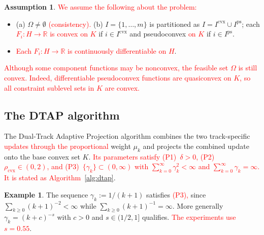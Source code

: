 \documentclass[]{interact}
\theoremstyle{plain}
\theoremstyle{definition}
\newtheorem{example}[theorem]{Example}
\newtheorem{assumption}{Assumption}
\theoremstyle{remark}
\newcommand{\R}{\mathbb{R}}
\newcommand{\cvx}{\mathrm{cvx}}
\newcommand{\ps}{\mathrm{ps}}
\begin{document}
\begin{assumption}\label{ass:standing}
\leavevmode\textcolor{red}{We assume the following about the problem:}
\begin{itemize}[leftmargin=2.4em,itemsep=2pt]
\item[\textup{(A1)}] \textup{(a)} $\Omega\ne\emptyset$ \leavevmode\textcolor{red}{(consistency).} \textup{(b)} $I=\{1,\dots,m\}$
is partitioned as $I=I^{\cvx}\cup I^{\ps}$; each \leavevmode\textcolor{red}{$F_i:H\to\R$ is convex on $K$} if
$i\in I^{\cvx}$ and pseudoconvex \leavevmode\textcolor{red}{on $K$} if $i\in I^{\ps}$.
\item[\textup{(A2)}] \leavevmode\textcolor{red}{Each $F_i:H\to\R$ is continuously differentiable on $H$}.
\end{itemize}
\end{assumption}
\leavevmode\textcolor{red}{Although some component functions may be nonconvex, the feasible set $\Omega$ is still convex. Indeed, differentiable pseudoconvex functions are quasiconvex on $K$, so all constraint sublevel sets in $K$ are convex.}

\subsection{The DTAP algorithm}\label{ssec:algorithm}
The Dual-Track Adaptive Projection algorithm combines the two track-specific \leavevmode\textcolor{red}{updates through the proportional} weight $\mu_k$ and projects the combined update onto the base convex set $K$. \leavevmode\textcolor{red}{Its parameters satisfy \textup{(P1)}~$\delta>0$, \textup{(P2)}~$\rho_{\cvx}\in(0,2)$, and \textup{(P3)}~$\{\gamma_k\}\subset(0,\infty)$ with $\sum_{k=0}^\infty\gamma_k^2<\infty$ and $\sum_{k=0}^\infty\gamma_k=\infty$. It is stated as Algorithm~\ref{alg:dtap}}.
\begin{example}\label{ex:gamma}
The sequence $\gamma_k:=1/(k+1)$ satisfies \leavevmode\textcolor{red}{(P3),} since $\sum_{k\ge0}(k+1)^{-2}<\infty$ while $\sum_{k\ge0}(k+1)^{-1}=\infty$. More generally $\gamma_k=(k+c)^{-s}$ with $c>0$ and $s\in(1/2,1]$ qualifies. \leavevmode\textcolor{red}{The experiments use $s=0.55$}.
\end{example}
\end{document}
